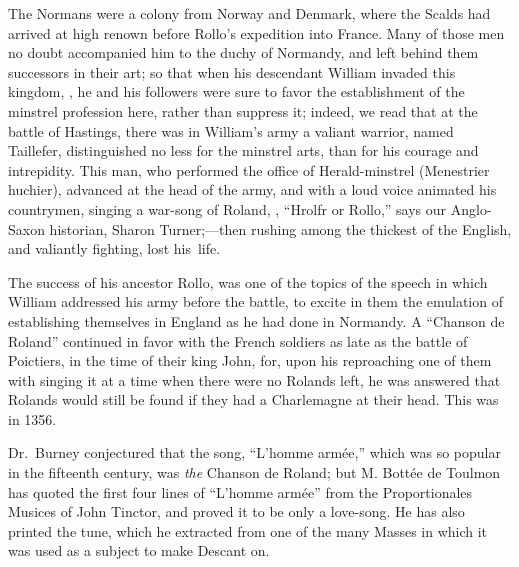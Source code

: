 The Normans were a colony from Norway and Denmark, where the Scalds
had arrived at high renown before Rollo’s expedition into France. Many
of those men no doubt accompanied him to the duchy of Normandy, and left
behind them successors in their art; so that when his descendant William
invaded this kingdom, , he and his followers were sure to favor the
establishment of the minstrel profession here, rather than suppress it; indeed,
we read that at the battle of Hastings, there was in William’s army a valiant
warrior, named Taillefer, distinguished no less for the minstrel arts, than for his
courage and intrepidity. This man, who performed the office of Herald-minstrel
(Menestrier huchier), advanced at the head of the army, and with a loud voice
animated his countrymen, singing a war-song of Roland, \ie, “Hrolfr or Rollo,”
says our Anglo-Saxon historian, Sharon Turner;—then rushing among the
thickest of the English, and valiantly fighting, lost his~life.

The success of his ancestor Rollo, was one of the topics of the speech in which
William addressed his army before the battle, to excite in them the emulation of
establishing themselves in England as he had done in Normandy. A “Chanson
de Roland” continued in favor with the French soldiers as late as the battle of
Poictiers, in the time of their king John, for, upon his reproaching one of them with
singing it at a time when there were no Rolands left, he was answered that
Rolands would still be found if they had a Charlemagne at their head. This was
in 1356.

Dr.~Burney conjectured that the song, “L’homme armée,” which was so popular
in the fifteenth century, was \textit{the} Chanson de Roland; but M. Bottée de Toulmon
has quoted the first four lines of “L’homme armée” from the Proportionales
Musices of John Tinctor, and proved it to be only a love-song. He has also
printed the tune, which he extracted from one of the many Masses in which it
was used as a subject to make Descant on. %
\pagebreak

